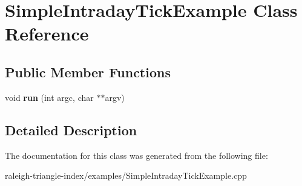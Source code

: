 \section{Simple\+Intraday\+Tick\+Example Class Reference}
\label{class_simple_intraday_tick_example}
\subsection*{Public Member Functions}
\begin{DoxyCompactItemize}
\item 
void {\bfseries run} (int argc, char $\ast$$\ast$argv)\label{class_simple_intraday_tick_example_a16b7d6b4c418008a507726bb6c66b1b6}

\end{DoxyCompactItemize}


\subsection{Detailed Description}


The documentation for this class was generated from the following file\+:\begin{DoxyCompactItemize}
\item 
raleigh-\/triangle-\/index/examples/Simple\+Intraday\+Tick\+Example.\+cpp\end{DoxyCompactItemize}
